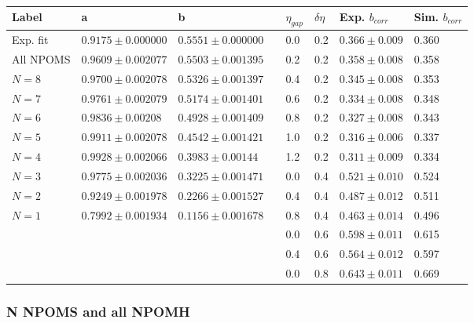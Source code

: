 \documentclass[]{article}
\begin{document}
\begin{table}[h!]
\centering
    \begin{tabular}{|l|l|l|c|l|l|l|l|}
        \hline
Label     & a      & b     &     & $\eta_{gap}$ & $\delta\eta$ &Exp. $b_{corr}$ &Sim. $b_{corr}$\\\hline
Exp. fit  &$0.9175\pm0.000000$&$0.5551\pm0.000000$&  & 0.0 		    & 0.2 		   &$0.366 \pm0.009$&0.360\\\hline
All NPOMS &$0.9609\pm0.002077$&$0.5503\pm0.001395$&	 & 0.2 			& 0.2 		   &$0.358 \pm0.008$&0.358\\\hline 
$N = 8$	  &$0.9700\pm0.002078$&$0.5326\pm0.001397$&	 & 0.4 			& 0.2 		   &$0.345 \pm0.008$&0.353\\\hline
$N = 7$	  &$0.9761\pm0.002079$&$0.5174\pm0.001401$&	 & 0.6 			& 0.2 		   &$0.334 \pm0.008$&0.348\\\hline
$N = 6$	  &$0.9836\pm0.00208 $&$0.4928\pm0.001409$&	 & 0.8 			& 0.2 		   &$0.327 \pm0.008$&0.343\\\hline
$N = 5$	  &$0.9911\pm0.002078$&$0.4542\pm0.001421$&	 & 1.0 			& 0.2 		   &$0.316 \pm0.006$&0.337\\\hline
$N = 4$	  &$0.9928\pm0.002066$&$0.3983\pm0.00144 $&	 & 1.2 			& 0.2 		   &$0.311 \pm0.009$&0.334\\\hline
$N = 3$	  &$0.9775\pm0.002036$&$0.3225\pm0.001471$&	 & 0.0 			& 0.4 		   &$0.521 \pm0.010$&0.524\\\hline
$N = 2$	  &$0.9249\pm0.001978$&$0.2266\pm0.001527$&	 & 0.4 			& 0.4 		   &$0.487 \pm0.012$&0.511\\\hline
$N = 1$	  &$0.7992\pm0.001934$&$0.1156\pm0.001678$&	 & 0.8 			& 0.4 		   &$0.463 \pm0.014$&0.496\\\hline
          &	                  &               &	     & 0.0			& 0.6		   &$0.598 \pm0.011$&0.615\\\hline
	      &                   &               &      & 0.4 			& 0.6 		   &$0.564 \pm0.012$&0.597\\\hline
		  &	                  &               &	     & 0.0 			& 0.8 		   &$0.643 \pm0.011$&0.669\\\hline
    \end{tabular}
\caption[b correlation table]{}
\end{table}

\newpage
\subsubsection*{\centering N NPOMS and all NPOMH}
\end{document}
